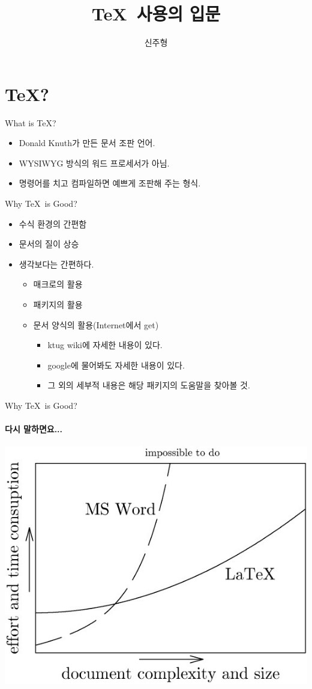 \documentclass{beamer}
\title{\TeX\ 사용의 입문}
\author{신주형}
\institute{Sejong Academy of Science and Arts}
\begin{document}
	\begin{frame}
		\maketitle
	\end{frame}
\section{\TeX?}
	\begin{frame}{What is \TeX?}
	\begin{itemize}
		\item{Donald Knuth가 만든 문서 조판 언어.}
		\item{WYSIWYG 방식의 워드 프로세서가 아님.}
		\item{명령어를 치고 컴파일하면 예쁘게 조판해 주는 형식.}
	\end{itemize}
	\end{frame}
	\begin{frame}{Why \TeX \ is Good?}
	\begin{itemize}
		
		\item{수식 환경의 간편함}
		\item{문서의 질이 상승}
		\item{생각보다는 간편하다.}
		\begin{itemize}
			\item{매크로의 활용}
			\item{패키지의 활용}
			\item{문서 양식의 활용(Internet에서 get)}
			\begin{itemize}
				\item{ktug wiki에 자세한 내용이 있다.}
				\item{google에 물어봐도 자세한 내용이 있다.}
				\item{그 외의 세부적 내용은 해당 패키지의 도움말을 찾아볼 것.}
			\end{itemize}
		\end{itemize}
	\end{itemize}
	\end{frame}
	\begin{frame}{Why \TeX \ is Good?}
		\framesubtitle{다시 말하면요...}
		\includegraphics[scale=0.3]{ffjqm_img.jpg}\centering
	\end{frame}
\end{document}
